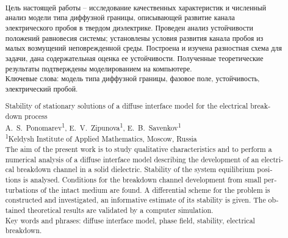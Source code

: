 \documentclass[a4paper,12pt]{article}
\title{
	\ArticleTitle
}
\author{
	\ArticleAuthors \\[3mm]
	{\normalsize \ArticleInstitutes}
}
\date{\vspace{-0.8cm}}
\theoremstyle{plain}
\theoremstyle{remark}
\newcommand{\ArticleTitleEnglish}{
	Stability of stationary solutions of a diffuse interface model for the electrical breakdown process
}
\newcommand{\ArticleAuthorsEnglish}{
	A.~S.~Ponomarev\textsuperscript{1}, E.~V.~Zipunova\textsuperscript{1}, E.~B.~Savenkov\textsuperscript{1}
}
\newcommand{\ArticleInstitutesEnglish}{
	\textsuperscript{1}Keldysh Institute of Applied Mathematics, Moscow, Russia
}
\begin{document}
\maketitle

\renewcommand{\abstractname}{}
\renewcommand{\absnamepos}{empty}
\begin{abstract}
{
	\noindent Цель настоящей работы -- исследование качественных характеристик и численный анализ модели типа диффузной границы, описывающей развитие канала электрического пробоя в твердом диэлектрике. Проведен анализ устойчивости положений равновесия системы; установлены условия развития канала пробоя из малых возмущений неповрежденной среды. Построена и изучена разностная схема для задачи, дана содержательная оценка ее устойчивости. Полученные теоретические результаты подтверждены моделированием на компьютере. \\[3mm]
	Ключевые слова: модель типа диффузной границы, фазовое поле, устойчивость, электрический пробой. \\[5mm]
}
\begin{otherlanguage}{english}
	\ArticleTitleEnglish \\[3mm]
	\ArticleAuthorsEnglish \\[3mm]
	\ArticleInstitutesEnglish \\[3mm]
	The aim of the present work is to study qualitative characteristics and to perform a numerical analysis of a diffuse interface model describing the development of an electrical breakdown channel in a solid dielectric. Stability of the system equilibrium positions is analysed. Conditions for the breakdown channel development from small perturbations of the intact medium are found. A differential scheme for the problem is constructed and investigated, an informative estimate of its stability is given. The obtained theoretical results are validated by a computer simulation. \\[3mm]
	Key words and phrases: diffuse interface model, phase field, stability, electrical breakdown.
\end{otherlanguage}
\end{abstract}














\printbibliography
\end{document}
